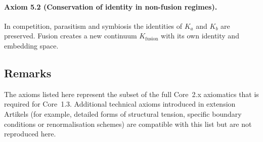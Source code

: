 \paragraph{Axiom 5.2 (Conservation of identity in non-fusion regimes).}
In competition, parasitism and symbiosis the identities of \(K_a\) and \(K_b\)
are preserved.  Fusion creates a new continuum \(K_{\mathrm{fusion}}\) with its
own identity and embedding space.

\subsection{Remarks}

The axioms listed here represent the subset of the full Core~2.x axiomatics
that is required for Core~1.3.  Additional technical axioms introduced in
extension Artikels (for example, detailed forms of structural tension, specific
boundary conditions or renormalisation schemes) are compatible with this list
but are not reproduced here.
